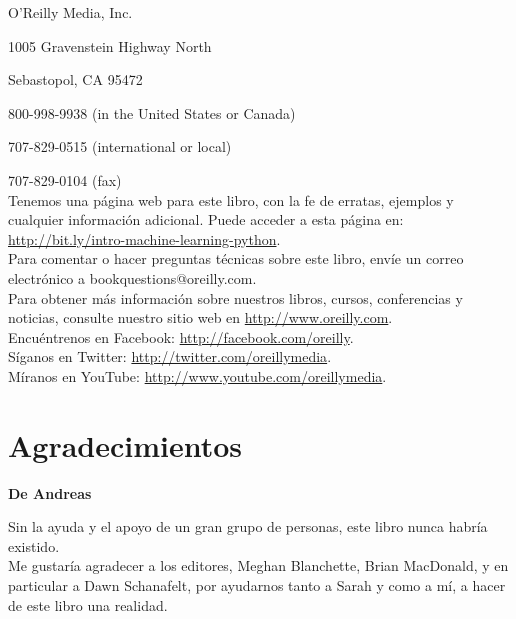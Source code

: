 O’Reilly Media, Inc.

1005 Gravenstein Highway North

Sebastopol, CA 95472

800-998-9938 (in the United States or Canada)

707-829-0515 (international or local)

707-829-0104 (fax)\\




Tenemos una página web para este libro, con la fe de erratas, ejemplos y cualquier información adicional. Puede acceder a esta página en:\\ \href{http://bit.ly/intro-machine-learning-python}{\color{vino}http://bit.ly/intro-machine-learning-python}.\\

Para comentar o hacer preguntas técnicas sobre este libro, envíe un correo electrónico a {\color{vino} bookquestions@oreilly.com}.\\

Para obtener más información sobre nuestros libros, cursos, conferencias y noticias, consulte nuestro sitio web en \href{https://www.oreilly.com/}{\color{vino} http://www.oreilly.com}.\\

Encuéntrenos en Facebook:   \href{ http://facebook.com/oreilly}{\color{vino} http://facebook.com/oreilly}.\\
Síganos en Twitter:   \href{ http://twitter.com/oreillymedia}{\color{vino} http://twitter.com/oreillymedia}.\\
Míranos en YouTube:   \hspace{0.5cm} \href{http://www.youtube.com/oreillymedia}{\color{vino} http://www.youtube.com/oreillymedia}.\\


\section*{Agradecimientos}

{\bf{De Andreas}}


Sin la ayuda y el apoyo de un gran grupo de personas, este libro nunca habría existido.\\

Me gustaría agradecer a los editores, Meghan Blanchette, Brian MacDonald, y en particular a Dawn Schanafelt, por ayudarnos tanto a Sarah y como a  mí,  a hacer de este libro una realidad.\\

